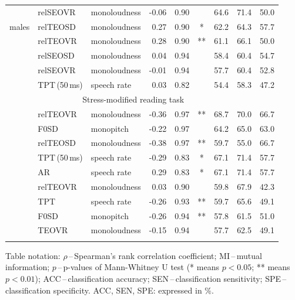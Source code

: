 \begin{table}[tb!]
\begin{threeparttable}
\begin{tabular}{l l l r c c c c c}
			\multirow{3}{*}{males}
			& relSEOVR & monoloudness & -0.06 & 0.90 &    & 64.6 & 71.4 & 50.0 \\
			& relTEOSD & monoloudness &  0.27 & 0.90 & *  & 62.2 & 64.3 & 57.7 \\
			& relTEOVR & monoloudness &  0.28 & 0.90 & ** & 61.1 & 66.1 & 50.0 \\
			\noalign{\smallskip}

			\multirow{3}{*}{all}
			& relSEOSD      & monoloudness &  0.04 & 0.94 &    & 58.4 & 60.4 & 54.7 \\
			& relSEOVR      & monoloudness & -0.01 & 0.94 &    & 57.7 & 60.4 & 52.8 \\
			& TPT\,(50\,ms) & speech rate  &  0.03 & 0.82 &    & 54.4 & 58.3 & 47.2 \\
			
		\noalign{\smallskip}\hline\noalign{\smallskip}			
		& \multicolumn{6}{c}{Stress-modified reading task} \\
		\noalign{\smallskip}\hline\noalign{\smallskip}
			
			\multirow{3}{*}{females}
			& relTEOVR & monoloudness & -0.36 & 0.97 & ** & 68.7 & 70.0 & 66.7 \\
			& F0SD     & monopitch    & -0.22 & 0.97 &    & 64.2 & 65.0 & 63.0 \\
			& relTEOSD & monoloudness & -0.38 & 0.97 & ** & 59.7 & 55.0 & 66.7 \\
			\noalign{\smallskip}

			\multirow{3}{*}{males}
			& TPT\,(50\,ms) & speech rate  & -0.29 & 0.83 & *  & 67.1 & 71.4 & 57.7 \\
			& AR            & speech rate  &  0.29 & 0.83 & *  & 67.1 & 71.4 & 57.7 \\
			& relTEOVR      & monoloudness &  0.03 & 0.90 &    & 59.8 & 67.9 & 42.3 \\
			\noalign{\smallskip}

			\multirow{3}{*}{all}
			& TPT   & speech rate  & -0.26 & 0.93 & ** & 59.7 & 65.6 & 49.1 \\
			& F0SD  & monopitch    & -0.26 & 0.94 & ** & 57.8 & 61.5 & 51.0 \\
			& TEOVR & monoloudness & -0.15 & 0.94 &    & 57.7 & 62.5 & 49.1 \\
			
			\noalign{\smallskip}\hline\hline
		\end{tabular}
		
		\begin{tablenotes}
			\scriptsize
			\item Table notation: $\rho$\,--\,Spearman's rank correlation coefficient; MI\,--\,mutual information; $p$\,--\,p-values of Mann-Whitney U test (* means $p<0.05$; ** means $p<0.01$); ACC\,--\,classification accuracy; SEN\,--\,classification sensitivity; SPE\,--\,classification specificity. ACC, SEN, SPE: expressed in $\%$.
		\end{tablenotes}
	\end{threeparttable}
\end{table}

